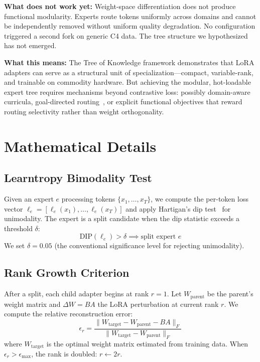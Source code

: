 \documentclass{article}
\newcommand{\tok}{Tree of Knowledge}
\begin{document}
\textbf{What does not work yet:} Weight-space differentiation does not produce
functional modularity. Experts route tokens uniformly across domains and
cannot be independently removed without uniform quality degradation. No
configuration triggered a second fork on generic C4 data. The tree structure
we hypothesized has not emerged.

\textbf{What this means:} The \tok{} framework demonstrates that LoRA
adapters can serve as a structural unit of specialization---compact,
variable-rank, and trainable on commodity hardware. But achieving the
modular, hot-loadable expert tree requires mechanisms beyond contrastive loss:
possibly domain-aware curricula, goal-directed routing~\cite{wozniak2018learntropy},
or explicit functional objectives that reward routing selectivity rather than
weight orthogonality.

\appendix

\section{Mathematical Details}
\label{app:math}

\subsection{Learntropy Bimodality Test}

Given an expert $e$ processing tokens $\{x_1, \ldots, x_T\}$, we compute the
per-token loss vector $\ell_e = [\ell_e(x_1), \ldots, \ell_e(x_T)]$ and apply
Hartigan's dip test~\cite{hartigan1985dip} for unimodality. The expert is a
split candidate when the dip statistic exceeds a threshold $\delta$:
\begin{equation}
    \text{DIP}(\ell_e) > \delta \implies \text{split expert } e
\end{equation}
We set $\delta = 0.05$ (the conventional significance level for rejecting
unimodality).

\subsection{Rank Growth Criterion}

After a split, each child adapter begins at rank $r = 1$. Let
$W_{\text{parent}}$ be the parent's weight matrix and $\Delta W = BA$ the LoRA
perturbation at current rank $r$. We compute the relative reconstruction error:
\begin{equation}
    \epsilon_r = \frac{\|W_{\text{target}} - W_{\text{parent}} - BA\|_F}{\|W_{\text{target}} - W_{\text{parent}}\|_F}
\end{equation}
where $W_{\text{target}}$ is the optimal weight matrix estimated from training
data. When $\epsilon_r > \epsilon_{\max}$, the rank is doubled: $r \leftarrow 2r$.
\end{document}
